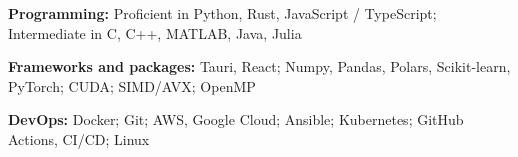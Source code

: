\begin{enumerate}[label={[\arabic*]},nosep]
  \item \textbf{Programming:} Proficient in Python, Rust, JavaScript / TypeScript; Intermediate in C, C++, MATLAB, Java, Julia
  \item \textbf{Frameworks and packages:} Tauri, React; Numpy, Pandas, Polars, Scikit-learn, PyTorch; CUDA; SIMD/AVX; OpenMP
  \item \textbf{DevOps:} Docker; Git; AWS, Google Cloud; Ansible; Kubernetes; GitHub Actions, CI/CD; Linux
\end{enumerate}
